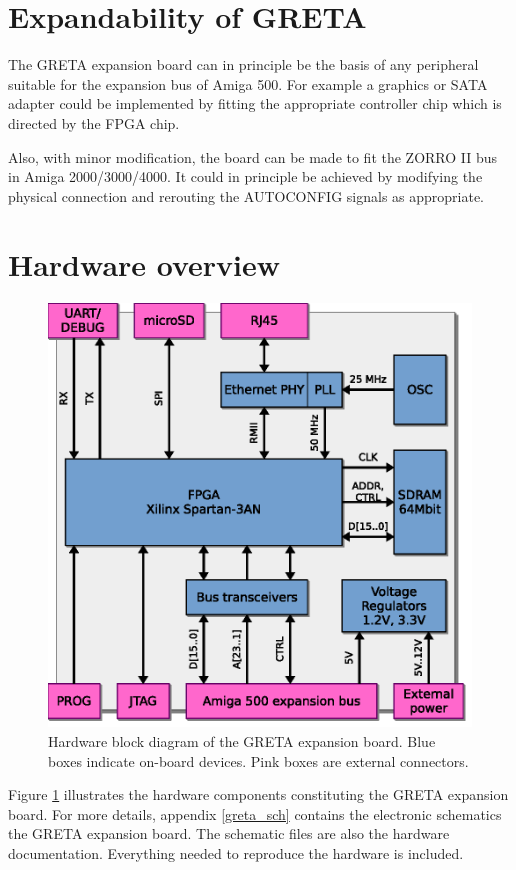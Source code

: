 \documentclass[a4paper]{report}
\begin{document}
\section{Expandability of GRETA}
The GRETA expansion board can in principle be the basis of any
peripheral suitable for the expansion bus of Amiga 500. For
example a graphics or SATA adapter could be implemented by
fitting the appropriate controller chip which is directed by
the FPGA chip.

Also, with minor modification, the board can be made to fit
the ZORRO II bus in Amiga 2000/3000/4000. It could in principle
be achieved by modifying the physical connection and rerouting
the AUTOCONFIG signals as appropriate.

\section{Hardware overview}
\begin{figure}
\centering
\includegraphics{hw_overview.eps}
\caption{Hardware block diagram of the GRETA expansion
board. Blue boxes indicate on-board devices. Pink boxes are
external connectors.}
\label{hw_overview}
\end{figure}

Figure \ref{hw_overview} illustrates the hardware components
constituting the GRETA expansion board.  For more details,
appendix \ref{greta_sch} contains the electronic schematics
the GRETA expansion board. The schematic files are also the
hardware documentation. Everything needed to reproduce the
hardware is included.
\end{document}
